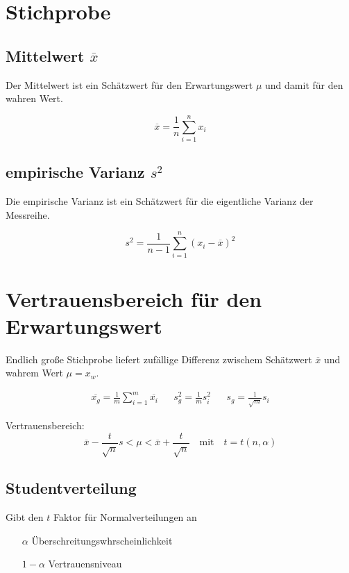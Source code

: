 \newpage
\section{Stichprobe}
\begin{multicols}{2}
	\subsection*{Mittelwert \texorpdfstring{$\overline{x}$}{}}
	Der Mittelwert ist ein Schätzwert für den Erwartungswert \(\mu\) und damit für
	den wahren Wert.

	\[\overline{x} = \frac{1}{n} \sum_{i = 1}^{n} x_i\]
	
	\subsection*{empirische Varianz \texorpdfstring{$s^2$}{}}
	Die empirische Varianz ist ein Schätzwert für die eigentliche Varianz der
	Messreihe.

	\[s^2 = \frac{1}{n-1} \sum_{i = 1}^{n} \left(x_i - \overline{x}\right)^2\]
	
	\vfill	
\end{multicols}

\section{Vertrauensbereich für den Erwartungswert}
Endlich große Stichprobe liefert zufällige Differenz zwischem Schätzwert
\(\overline{x}\) und wahrem Wert \(\mu=x_w\).

\begin{alignat*}{3}
	\overline{x_g} = \frac{1}{m}\sum_{i = 1}^{m}\overline{x_i} && s_{g}^2 =
	\frac{1}{m}s_{i}^2 && s_g = \frac{1}{\sqrt{m}}s_i
\end{alignat*}

Vertrauensbereich:
\[
\overline{x} - \frac{t}{\sqrt{n}} s < \mu < \overline{x} + \frac{t}{\sqrt{n}} \quad
\text{mit} \quad t = t\left( n, \alpha \right)
\]

\subsection*{Studentverteilung}
Gibt den \(t\) Faktor für Normalverteilungen an
\begin{itemize}
  \item [\(\alpha\)] Überschreitungswhrscheinlichkeit
  \item [\(1 - \alpha\)] Vertrauensniveau
\end{itemize} 

